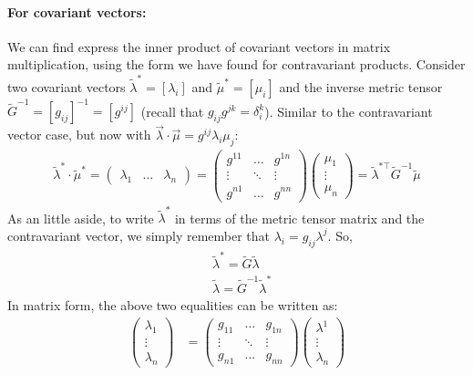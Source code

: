 \documentclass{article}
\theoremstyle{definition}
\begin{document}
\paragraph{For covariant vectors:\\}
We can find express the inner product of covariant vectors in matrix multiplication, using the form we have found for contravariant products. Consider two covariant vectors $\tilde{\lambda}^* = [\lambda_i]$ and $\tilde{\mu}^* = [\mu_i]$ and the inverse metric tensor $\tilde{G}^{-1} = [g_{ij}]^{-1} = [g^{ij}]$ (recall that $g_{ij}g^{jk} = \delta^k_i$). Similar to the contravariant vector case, but now with $\vec{\lambda}\cdot\vec{\mu} = g^{ij}\lambda_i\mu_j$:
\begin{align*}
\boxed{
\tilde{\lambda}^*\cdot\tilde{\mu}^* = 
\begin{pmatrix}
\lambda_1 & \dots & \lambda_n
\end{pmatrix}
=
\begin{pmatrix}
g^{11} & \dots & g^{1n}\\
\vdots & \ddots & \vdots \\
g^{n1} & \dots & g^{nn}
\end{pmatrix}
\begin{pmatrix}
\mu_1 \\
\vdots\\
\mu_n
\end{pmatrix}
=
\tilde{\lambda}^{*\top}\tilde{G}^{-1}\tilde{\mu}
}
\end{align*}
As an little aside, to write $\tilde{\lambda}^*$ in terms of the metric tensor matrix and the contravariant vector, we simply remember that $\lambda_i = g_{ij}\lambda^j$. So,
\begin{align*}
&\tilde{\lambda}^* = \tilde{G}\tilde{\lambda}\\
&\tilde{\lambda} = \tilde{G}^{-1}\tilde{\lambda}^*
\end{align*}
In matrix form, the above two equalities can be written as:
\begin{align*}
\begin{pmatrix}
\lambda_1 \\
\vdots\\
\lambda_n
\end{pmatrix}
&=
\begin{pmatrix}
g_{11} & \dots & g_{1n}\\
\vdots & \ddots & \vdots\\
g_{n1} & \dots & g_{nn}
\end{pmatrix}
\begin{pmatrix}
\lambda^1\\
\vdots\\
\lambda_n
\end{pmatrix}
\end{align*}
\end{document}
